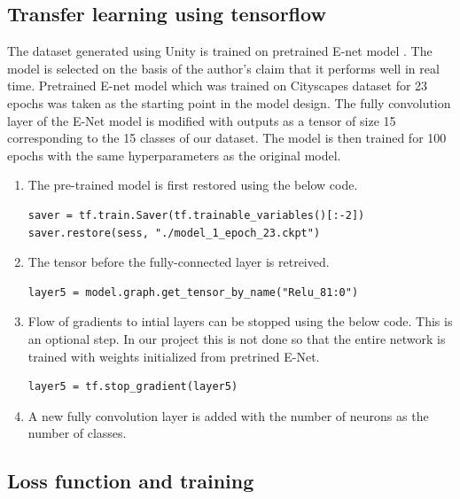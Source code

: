 \documentclass[a4paper, 12pt, oneside, BCOR1cm,toc=chapterentrywithdots]{scrbook}
\begin{document}
\subsection{Transfer learning using tensorflow}

The dataset generated using Unity is trained on pretrained E-net model \cite{Paszke2017ENetAD}. The model is selected on the basis of the author's claim that it performs well in real time. Pretrained E-net model which was trained on Cityscapes dataset \cite{Cordts2016Cityscapes} for 23 epochs was taken as the starting point in the model design. The fully convolution layer of the E-Net model is modified with outputs as a tensor of size 15 corresponding to the 15 classes of our dataset. The model is then trained for 100 epochs with the same hyperparameters as the original model.
\newline

\begin{enumerate}
\item The pre-trained model is first restored using the below code.

\begin{lstlisting}
saver = tf.train.Saver(tf.trainable_variables()[:-2])
saver.restore(sess, "./model_1_epoch_23.ckpt")
\end{lstlisting}

\item The tensor before the fully-connected layer is retreived.
\begin{lstlisting}
layer5 = model.graph.get_tensor_by_name("Relu_81:0")
\end{lstlisting}

\item Flow of gradients to intial layers can be stopped using the below code. This is an optional step. In our project this is not done so that the entire network is trained with weights initialized from pretrined E-Net.

\begin{lstlisting}
layer5 = tf.stop_gradient(layer5)
\end{lstlisting}

\item A new fully convolution layer is added with the number of neurons as the number of classes.
\end{enumerate}

\subsection{Loss function and training}
\end{document}
